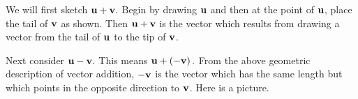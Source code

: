 \begin{solution}
We will first sketch $\mathbf{u}+\mathbf{v}.$ Begin by drawing $\mathbf{u}$
and then at the point of $\mathbf{u}$, place the tail of $\mathbf{v}$ as
shown. Then $\mathbf{u}+\mathbf{v}$ is the vector which results from
drawing a vector from the tail of $\mathbf{u}$ to the tip of $\mathbf{v}$.

\begin{center}
\end{center}

Next consider $\mathbf{u}-\mathbf{v}.$ This means $\mathbf{u}+\left( -\mathbf{v}
\right) .$ From the above geometric description of vector addition, $-\mathbf{v}$ 
is the vector which has the same length but which points in the
opposite direction to $\mathbf{v}$. Here is a picture.

\begin{center}
\end{center}
\end{solution}
